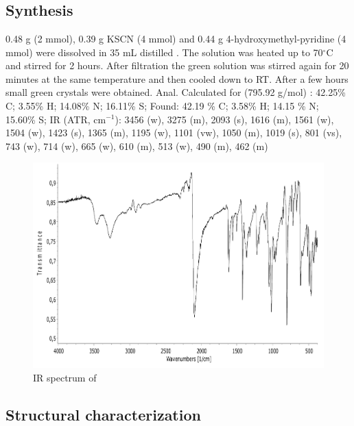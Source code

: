 \section{}
\subsection{Synthesis}
0.48 g  (2 mmol), 0.39 g KSCN (4 mmol) and 0.44 g 4-hydroxymethyl-pyridine (4 mmol) were dissolved in 35 mL distilled . The solution was heated up to 70$^\circ$C  and stirred for 2 hours. After filtration the green solution was stirred again for 20 minutes at the same temperature and then cooled down to RT. After a few hours small green crystals were obtained.
Anal. Calculated for  (795.92 g/mol) : 42.25\% C; 3.55\% H; 14.08\% N; 16.11\% S;
Found: 42.19 \% C; 3.58\% H; 14.15 \% N; 15.60\% S;
IR (ATR, cm$^{-1}$): 3456 (w), 3275 (m), 2093 (s), 1616 (m), 1561 (w), 1504 (w), 1423 (s), 1365 (m), 1195 (w), 1101 (vw), 1050 (m), 1019 (s), 801 (vs), 743 (w), 714 (w), 665 (w), 610 (m), 513 (w), 490 (m), 462 (m)

\begin{figure}[h!]
\centering
\includegraphics[width=1\textwidth]{figures/CuR4HOMP-IR.pdf}
\caption{IR spectrum of }
\end{figure}

\newpage
\subsection{Structural characterization}

